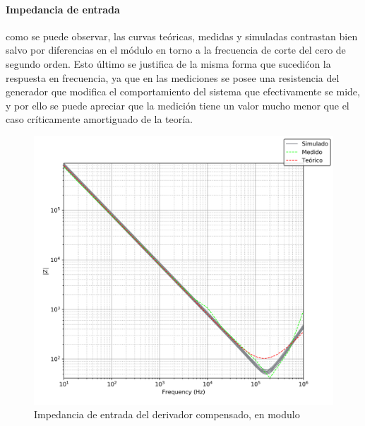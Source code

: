 \paragraph*{Impedancia de entrada} como se puede observar, las curvas te\'oricas, medidas y simuladas contrastan bien salvo
por diferencias en el m\'odulo en torno a la frecuencia de corte del cero de segundo orden. Esto \'ultimo se justifica de la misma forma que sucedi\' con la 
respuesta en frecuencia, ya que en las mediciones se posee una resistencia del generador que modifica el comportamiento del sistema que efectivamente se mide,
y por ello se puede apreciar que la medici\'on tiene un valor mucho menor que el caso cr\'iticamente amortiguado de la teor\'ia.

\begin{figure}[H]
	\centering
	\includegraphics[scale=0.7]{Recursos/Derivador_compensado/impedancia_modulo.png}
	\caption{Impedancia de entrada del derivador compensado, en modulo}
	\label{fig:derivador_compensado_impedancia_modulo}
\end{figure}

